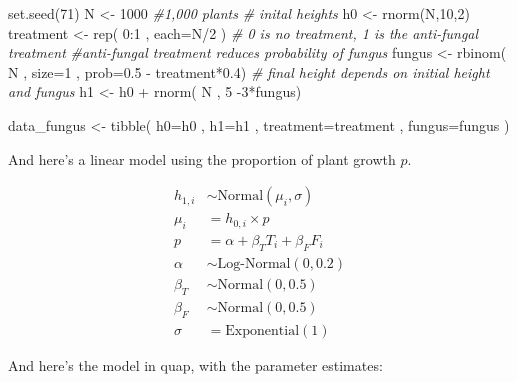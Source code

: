\documentclass[
]{book}
\newenvironment{Shaded}{\begin{snugshade}}{\end{snugshade}}
\newcommand{\AttributeTok}[1]{\textcolor[rgb]{0.77,0.63,0.00}{#1}}
\newcommand{\CommentTok}[1]{\textcolor[rgb]{0.56,0.35,0.01}{\textit{#1}}}
\newcommand{\DecValTok}[1]{\textcolor[rgb]{0.00,0.00,0.81}{#1}}
\newcommand{\FloatTok}[1]{\textcolor[rgb]{0.00,0.00,0.81}{#1}}
\newcommand{\FunctionTok}[1]{\textcolor[rgb]{0.00,0.00,0.00}{#1}}
\newcommand{\NormalTok}[1]{#1}
\newcommand{\OtherTok}[1]{\textcolor[rgb]{0.56,0.35,0.01}{#1}}
\newcommand{\SpecialCharTok}[1]{\textcolor[rgb]{0.00,0.00,0.00}{#1}}
\begin{document}
\begin{Shaded}
\begin{Highlighting}[]
\FunctionTok{set.seed}\NormalTok{(}\DecValTok{71}\NormalTok{) }
\NormalTok{N }\OtherTok{\textless{}{-}} \DecValTok{1000} \CommentTok{\#1,000 plants}
\CommentTok{\# inital heights}
\NormalTok{h0 }\OtherTok{\textless{}{-}} \FunctionTok{rnorm}\NormalTok{(N,}\DecValTok{10}\NormalTok{,}\DecValTok{2}\NormalTok{) }
\NormalTok{treatment }\OtherTok{\textless{}{-}} \FunctionTok{rep}\NormalTok{( }\DecValTok{0}\SpecialCharTok{:}\DecValTok{1}\NormalTok{ , }\AttributeTok{each=}\NormalTok{N}\SpecialCharTok{/}\DecValTok{2}\NormalTok{ ) }\CommentTok{\# 0 is no treatment, 1 is the anti{-}fungal treatment}
\CommentTok{\#anti{-}fungal treatment reduces probability of fungus}
\NormalTok{fungus }\OtherTok{\textless{}{-}} \FunctionTok{rbinom}\NormalTok{( N , }\AttributeTok{size=}\DecValTok{1}\NormalTok{ , }\AttributeTok{prob=}\FloatTok{0.5} \SpecialCharTok{{-}}\NormalTok{ treatment}\SpecialCharTok{*}\FloatTok{0.4}\NormalTok{) }
\CommentTok{\# final height depends on initial height and fungus}
\NormalTok{h1 }\OtherTok{\textless{}{-}}\NormalTok{ h0 }\SpecialCharTok{+} \FunctionTok{rnorm}\NormalTok{( N , }\DecValTok{5} \SpecialCharTok{{-}}\DecValTok{3}\SpecialCharTok{*}\NormalTok{fungus) }

\NormalTok{data\_fungus }\OtherTok{\textless{}{-}} \FunctionTok{tibble}\NormalTok{( }\AttributeTok{h0=}\NormalTok{h0 , }\AttributeTok{h1=}\NormalTok{h1 , }\AttributeTok{treatment=}\NormalTok{treatment , }\AttributeTok{fungus=}\NormalTok{fungus )}
\end{Highlighting}
\end{Shaded}

And here's a linear model using the proportion of plant growth \(p\).

\[
\begin{aligned}
h_{1,i} &\sim \text{Normal}(\mu_i,\sigma)\\
\mu_i &= h_{0,i} \times p\\
p &= \alpha + \beta_T T_i + \beta_F F_i \\
\alpha &\sim \text{Log-Normal}(0,0.2)\\
\beta_T &\sim \text{Normal}(0,0.5)\\
\beta_F &\sim \text{Normal}(0,0.5) \\
\sigma &=\text{Exponential}(1)
\end{aligned}
\]

And here's the model in quap, with the parameter estimates:
\end{document}
